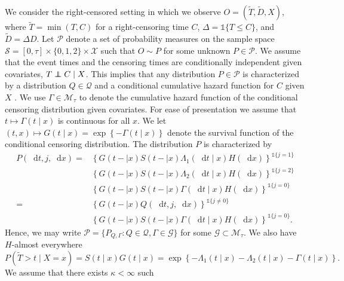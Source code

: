 \documentclass[alpha-refs]{wiley-article}
\newcommand\independent{\protect\mathpalette{\protect\independenT}{\perp}}
\def\independenT#1#2{\mathrel{\rlap{$#1#2$}\mkern2mu{#1#2}}}
\newcommand*\diff{\mathop{}\!\mathrm{d}}
\newcommand{\1}{\mathbb{1}}
\newcommand{\sample}{\ensuremath{\mathcal{S}}}
\begin{document}
We consider the right-censored setting in which we observe \(O =
(\tilde{T},\tilde D, X)\), where $\tilde T = \min(T,C)$ for a
right-censoring time \(C\), $\Delta = \1{\{T \leq C\}}$, and \(\tilde
D=\Delta D\). Let \(\mathcal{P}\) denote a set of probability measures
on the sample space \(\sample = [0, \tau] \times \{0, 1, 2\}
\times \mathcal{X}\) such that \(O \sim P \) for some unknown \(P\in
\mathcal{P}\). We assume that the event times and the censoring times
are conditionally independent given covariates, \( T \independent C
\mid X \). This implies that any distribution \( P \in \mathcal{P} \)
is characterized by a distribution \( Q \in \mathcal{Q} \) and a
conditional cumulative hazard function for \( C \) given \( X \)
\citep[c.f.,][]{begun1983information,gill1997coarsening}. We use
\(\Gamma\in\mathcal{M}_{\tau}\) to denote the cumulative hazard
function of the conditional censoring distribution given
covariates. For ease of presentation we assume that \(t\mapsto
\Gamma(t \mid x) \) is continuous for all \( x \). We let
\((t,x)\mapsto G(t \mid x)=\exp\left\{-\Gamma(t \mid x)\right\}\)
denote the survival function of the conditional censoring
distribution. The distribution \( P \) is characterized by
\begin{equation}\label{eq:parametrizeP}
  \begin{split}
    P(\diff t, j, \diff x) =& \left\{G(t- \mid x)S(t- \mid x)\Lambda_1(\diff t \mid x)H(\diff x)\right\}^{\1{{\{j=1\}}}}\\
                            & \left\{G(t- \mid x)S(t- \mid x)\Lambda_2(\diff t \mid x)H(\diff x)\right\}^{\1{{\{j=2\}}}}\\
                            & \left\{G(t- \mid x)S(t- \mid x)\Gamma(\diff t \mid x)H(\diff x)\right\}^{\1{{\{j=0\}}}}\\
    = & \left\{G(t- \mid x)Q(\diff t,j,\diff x)\right\}^{\1{{\{j\ne 0\}}}}\\    
                            & \left\{G(t- \mid x)S(t- \mid x)\Gamma(\diff t \mid x)H(\diff x)\right\}^{\1{{\{j=0\}}}}.
  \end{split}
\end{equation}
Hence, we may write
\( \mathcal{P} = \{ P_{Q, \Gamma} : Q \in \mathcal{Q}, \Gamma \in
\mathcal{G} \} \) for some \( \mathcal{G} \subset \mathcal{M}_{\tau} \). We
also have \(H\)-almost everywhere
\begin{equation*}
P(\tilde T>t \mid X=x) = S(t \mid x)G(t \mid x) = \exp\left\{-\Lambda_{1}(t \mid x)-\Lambda_{2}(t \mid x)-\Gamma(t \mid x) \right\}.
\end{equation*} We assume that there exists \(\kappa<\infty\) such
\end{document}
